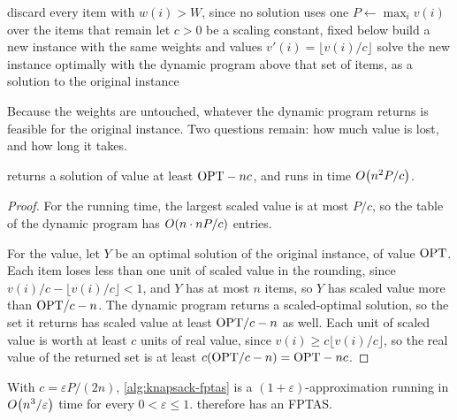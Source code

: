 \begin{algorithm}[ht]
\caption{FPTAS for }
\label{alg:knapsack-fptas}
\begin{algorithmic}[1]
  \State discard every item with $w(i) > W$, since no solution uses one
  \State $P \gets \max_i v(i)$ over the items that remain
  \State let $c > 0$ be a scaling constant, fixed below
  \State build a new instance with the same weights and values
         $v'(i) = \lfloor v(i)/c \rfloor$
  \State solve the new instance optimally with the dynamic program above
  \State \Return that set of items, as a solution to the original instance
\end{algorithmic}
\end{algorithm}

Because the weights are untouched, whatever the dynamic program returns is
feasible for the original instance. Two questions remain: how much value is
lost, and how long it takes.

\begin{lemma}\label{lem:knapsack-scaling}
 returns a solution of value at least $\mathrm{OPT} - nc$, and
runs in time $O\!\left(n^2P/c\right)$.
\end{lemma}

\begin{proof}
For the running time, the largest scaled value is at most $P/c$, so the table of
the dynamic program has $O\!\left(n \cdot nP/c\right)$ entries.

For the value, let $Y$ be an optimal solution of the original instance, of value
$\mathrm{OPT}$. Each item loses less than one unit of scaled value in the rounding,
since $v(i)/c - \lfloor v(i)/c\rfloor < 1$, and $Y$ has at most $n$ items, so
$Y$ has scaled value more than $\mathrm{OPT}/c - n$. The dynamic program returns a
scaled-optimal solution, so the set it returns has scaled value at least
$\mathrm{OPT}/c - n$ as well. Each unit of scaled value is worth at least $c$ units of
real value, since $v(i) \ge c\lfloor v(i)/c \rfloor$, so the real value of the
returned set is at least $c(\mathrm{OPT}/c - n) = \mathrm{OPT} - nc$.
\end{proof}

\begin{theorem}\label{thm:knapsack-fptas}
With $c = \varepsilon P / (2n)$, \cref{alg:knapsack-fptas} is a
$(1+\varepsilon)$-approximation running in $O\!\left(n^3/\varepsilon\right)$ time for
every $0 < \varepsilon \le 1$.  therefore has an FPTAS.
\end{theorem}

